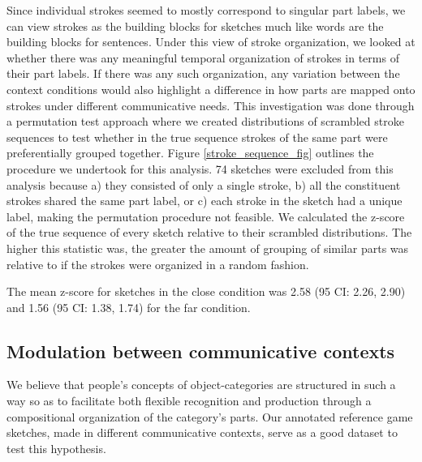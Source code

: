 \documentclass[10pt,letterpaper]{article}
\newcommand{\jefan}[1]{{\color{blue}{[jefan: #1]}}}
\begin{document}
Since individual strokes seemed to mostly correspond to singular part labels, we can view strokes as the building blocks for sketches much like words are the building blocks for sentences. Under this view of stroke organization, we looked at whether there was any meaningful temporal organization of strokes in terms of their part labels. If there was any such organization, any variation between the context conditions would also highlight a difference in how parts are mapped onto strokes under different communicative needs. This investigation was done through a permutation test approach where we created distributions of scrambled stroke sequences to test whether in the true sequence strokes of the same part were preferentially grouped together. Figure \ref{stroke_sequence_fig} outlines the procedure we undertook for this analysis.
74 sketches were excluded from this analysis because a) they consisted of only a single stroke, b) all the constituent strokes shared the same part label, or c) each stroke in the sketch had a unique label, making the permutation procedure not feasible.
We calculated the z-score of the true sequence of every sketch relative to their scrambled distributions. The higher this statistic was, the greater the amount of grouping of similar parts was relative to if the strokes were organized in a random fashion.

 The mean z-score for sketches in the close condition was 2.58 (95 CI: 2.26, 2.90) and 1.56 (95 CI: 1.38, 1.74) for the far condition.


 


\subsection{Modulation between communicative contexts}
\jefan{where we would report analysis of the sketch part features (num strokes, arc length)
e.g., when the far sketches are more abstract, how does that manifest in this feature representation?
like, are they more similar to each other, more like "bird" and lacking object-specific details?
a way of measuring this is that the centroid (euclidean norm, magnitude of the vector) is closer to the origin for far vs. close, and also that the RMSD to centroid of far sketches is smaller than for close sketches.... }

We believe that people's concepts of object-categories are structured in such a way so as to facilitate both flexible recognition and production through a compositional organization of the category's parts. Our annotated reference game sketches, made in different communicative contexts, serve as a good dataset to test this hypothesis.
\end{document}
